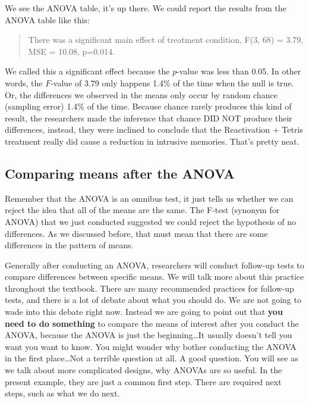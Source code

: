 \documentclass[
  letterpaper,
  DIV=11,
  numbers=noendperiod]{scrreprt}
\begin{document}
We see the ANOVA table, it's up there. We could report the results from
the ANOVA table like this:

\begin{quote}
There was a significant main effect of treatment condition, F(3, 68) =
3.79, MSE = 10.08, p=0.014.
\end{quote}

We called this a significant effect because the \(p\)-value was less
than 0.05. In other words, the \(F\)-value of 3.79 only happens 1.4\% of
the time when the null is true. Or, the differences we observed in the
means only occur by random chance (sampling error) 1.4\% of the time.
Because chance rarely produces this kind of result, the researchers made
the inference that chance DID NOT produce their differences, instead,
they were inclined to conclude that the Reactivation + Tetris treatment
really did cause a reduction in intrusive memories. That's pretty neat.

\subsection{Comparing means after the
ANOVA}\label{comparing-means-after-the-anova}

Remember that the ANOVA is an omnibus test, it just tells us whether we
can reject the idea that all of the means are the same. The F-test
(synonym for ANOVA) that we just conducted suggested we could reject the
hypothesis of no differences. As we discussed before, that must mean
that there are some differences in the pattern of means.

Generally after conducting an ANOVA, researchers will conduct follow-up
tests to compare differences between specific means. We will talk more
about this practice throughout the textbook. There are many recommended
practices for follow-up tests, and there is a lot of debate about what
you should do. We are not going to wade into this debate right now.
Instead we are going to point out that \textbf{you need to do something}
to compare the means of interest after you conduct the ANOVA, because
the ANOVA is just the beginning\ldots It usually doesn't tell you want
you want to know. You might wonder why bother conducting the ANOVA in
the first place\ldots Not a terrible question at all. A good question.
You will see as we talk about more complicated designs, why ANOVAs are
so useful. In the present example, they are just a common first step.
There are required next steps, such as what we do next.
\end{document}
